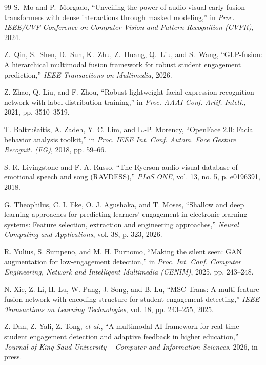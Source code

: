 \documentclass[journal]{IEEEtran}
\begin{document}
\begin{thebibliography}{99}
S.~Mo and P.~Morgado, ``Unveiling the power of audio-visual early fusion transformers with dense interactions through masked modeling,'' in \emph{Proc. IEEE/CVF Conference on Computer Vision and Pattern Recognition (CVPR)}, 2024.

Z.~Qin, S.~Shen, D.~Sun, K.~Zhu, Z.~Huang, Q.~Liu, and S.~Wang, ``GLP-fusion: A hierarchical multimodal fusion framework for robust student engagement prediction,'' \emph{IEEE Transactions on Multimedia}, 2026.


Z. Zhao, Q. Liu, and F. Zhou, ``Robust lightweight facial expression recognition network with label distribution training,'' in \emph{Proc. AAAI Conf. Artif. Intell.}, 2021, pp. 3510--3519.

T. Baltru\v{s}aitis, A. Zadeh, Y. C. Lim, and L.-P. Morency, ``OpenFace 2.0: Facial behavior analysis toolkit,'' in \emph{Proc. IEEE Int. Conf. Autom. Face Gesture Recognit. (FG)}, 2018, pp. 59--66.

S. R. Livingstone and F. A. Russo, ``The Ryerson audio-visual database of emotional speech and song (RAVDESS),'' \emph{PLoS ONE}, vol. 13, no. 5, p. e0196391, 2018.


G. Theophilus, C. I. Eke, O. J. Agushaka, and T. Moses, ``Shallow and deep learning approaches for predicting learners' engagement in electronic learning systems: Feature selection, extraction and engineering approaches,'' \emph{Neural Computing and Applications}, vol. 38, p. 323, 2026.

R. Yulius, S. Sumpeno, and M. H. Purnomo, ``Making the silent seen: GAN augmentation for low-engagement detection,'' in \emph{Proc. Int. Conf. Computer Engineering, Network and Intelligent Multimedia (CENIM)}, 2025, pp. 243--248.

N. Xie, Z. Li, H. Lu, W. Pang, J. Song, and B. Lu, ``MSC-Trans: A multi-feature-fusion network with encoding structure for student engagement detecting,'' \emph{IEEE Transactions on Learning Technologies}, vol. 18, pp. 243--255, 2025.

Z. Dan, Z. Yali, Z. Tong, \emph{et al.}, ``A multimodal AI framework for real-time student engagement detection and adaptive feedback in higher education,'' \emph{Journal of King Saud University -- Computer and Information Sciences}, 2026, in press. %


\end{thebibliography}
\end{document}
